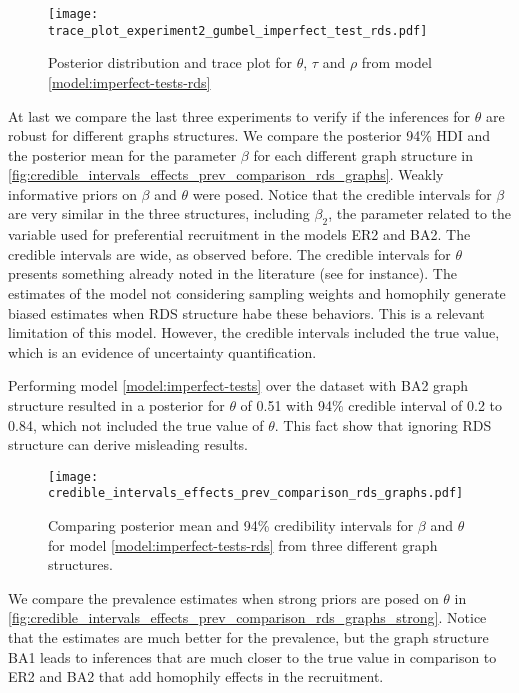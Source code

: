 \begin{figure}
  \centering
  \caption{\label{fig:trace_plot_experiment2_gumbel_imperfect_test_rds}Posterior
  distribution and trace plot for $\theta$, $\tau$ and $\rho$ from model 
  \eqref{model:imperfect-tests-rds}}
  \texttt{[image: trace\_plot\_experiment2\_gumbel\_imperfect\_test\_rds.pdf]}
\end{figure}

At last we compare the last three experiments to verify if the inferences for
$\theta$ are robust for different graphs structures. We compare the posterior
94\% HDI and the posterior mean for the parameter $\beta$ for each different
graph structure in
\autoref{fig:credible_intervals_effects_prev_comparison_rds_graphs}. Weakly
informative priors on $\beta$ and $\theta$ were posed. Notice that the
credible intervals for $\beta$ are very similar in the three structures,
including $\beta_2$, the parameter related to the variable used for
preferential recruitment in the models ER2 and BA2. The credible intervals are
wide, as observed before. The credible intervals for $\theta$ presents
something already noted in the literature (see \cite{gile2018methods} for
instance). The estimates of the model not considering sampling weights and
homophily generate biased estimates when RDS structure habe these behaviors.
This is a relevant limitation of this model. However, the credible intervals
included the true value, which is an evidence of uncertainty quantification.

Performing model \eqref{model:imperfect-tests} over the dataset with BA2 graph
structure resulted in a posterior for $\theta$ of 0.51 with 94\% credible
interval of 0.2 to 0.84, which not included the true value of $\theta$. This
fact show that ignoring RDS structure can derive misleading results. 

\begin{figure}
  \centering
  \caption{\label{fig:credible_intervals_effects_prev_comparison_rds_graphs}Comparing
  posterior mean and 94\% credibility intervals for $\beta$ and $\theta$ for model
  \eqref{model:imperfect-tests-rds} from three different graph structures.}
  \texttt{[image: credible\_intervals\_effects\_prev\_comparison\_rds\_graphs.pdf]}
\end{figure}

We compare the prevalence estimates when strong priors are posed on $\theta$
in \autoref{fig:credible_intervals_effects_prev_comparison_rds_graphs_strong}.
Notice that the estimates are much better for the prevalence, but the graph structure
BA1 leads to inferences that are much closer to the true value in comparison
to ER2 and BA2 that add homophily effects in the recruitment.

